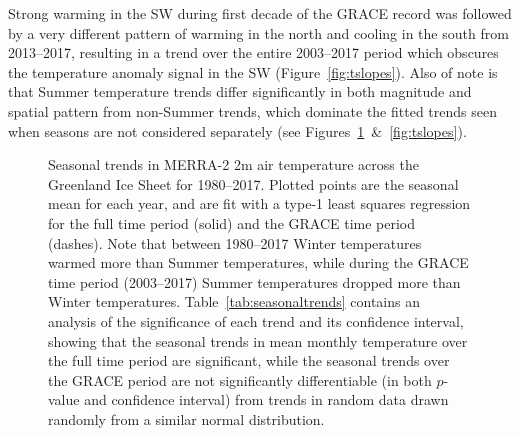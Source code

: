 \documentclass[11pt]{report}
\begin{document}

Strong warming in the SW during first decade of the GRACE record was followed by a very different pattern of warming in the north and cooling in the south from 2013--2017, resulting in a trend over the entire 2003--2017 period which obscures the temperature anomaly signal in the SW (Figure~\ref{fig:tslopes}). Also of note is that Summer temperature trends differ significantly in both magnitude and spatial pattern from non-Summer trends, which dominate the fitted trends seen when seasons are not considered separately (see Figures~\ref{fig:seasonalclimate}~\&~\ref{fig:tslopes}).


 \begin{figure}[h]
\centering
{}
\caption[Seasonal 2m temperature trends over the Greenland Ice Sheet: 1980--2017]{Seasonal trends in MERRA-2 2m air temperature across the Greenland Ice Sheet for 1980--2017. Plotted points are the seasonal mean for each year, and are fit with a type-1 least squares regression for the full time period (solid) and the GRACE time period (dashes). Note that between 1980--2017 Winter temperatures warmed more than Summer temperatures, while during the GRACE time period (2003--2017) Summer temperatures dropped more than Winter temperatures. Table~\ref{tab:seasonaltrends} contains an analysis of the significance of each trend and its confidence interval, showing that the seasonal trends in mean monthly temperature over the full time period are significant, while the seasonal trends over the GRACE period are not significantly differentiable (in both $p$-value and confidence interval) from trends in random data drawn randomly from a similar normal distribution. \label{fig:seasonalclimate}}
\end{figure}
\end{document}
